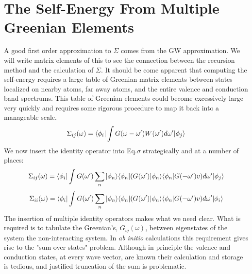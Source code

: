%
%
%


\section{The Self-Energy From Multiple Greenian Elements}
  A good first order approximation to $\Sigma$ comes from the GW approximation.
We will write matrix elements of this to see the connection between the
recursion method and the calculation of $\Sigma$. It should be come apparent that computing
the self-energy requires a large table of Greenian matrix elements between states localized
on nearby atoms, far away atoms, and the entire valence and conduction band spectrums. 
This table of Greenian elements could become excessively large very quickly and requires some
rigorous procedure to map it back into a manageable scale.
%
\begin{equation}
\label{eq:sigma}
\Sigma_{ij}(\omega) = \langle\phi_{i}|\int G(\omega-\omega')W(\omega')d\omega'|\phi_{j}\rangle
\end{equation}
%
We now insert the identity operator into Eq.$\sigma$ strategically and at a number of places:
%
\begin{equation}
\label{eq:sigma}
\Sigma_{ij}(\omega) = \langle\phi_{i}|\int G(\omega')\sum_{n}|\phi_{n}\rangle\langle\phi_{n}|(G(\omega')|\phi_{n}\rangle\langle\phi_{n}|G(-\omega')v)d\omega'|\phi_{j}\rangle
\end{equation}
%
\begin{equation}
\label{eq:sigma_onsite}%
\Sigma_{ii}(\omega) = \bra\phi_{i}|\int G(\omega')\sum_{n}|\phi_{n}\ket\bra\phi_{n}|(G(\omega')|\phi_{n}\ket\bra\phi_{n}|G(-\omega')v)d\omega'|\phi_{i}\ket
\end{equation}
%
The insertion of multiple identity operators makes what we need clear. What is required 
is to tabulate the Greenian's, $G_{ij}(\omega)$, between eigenstates of the system
the non-interacting system. In {\it ab initio} calculations this requirement 
gives rise to the "sum over states" problem. Although in principle the valence
and conduction states, at every wave vector, are known their calculation and storage
is tedious, and justified truncation of the sum is problematic.

